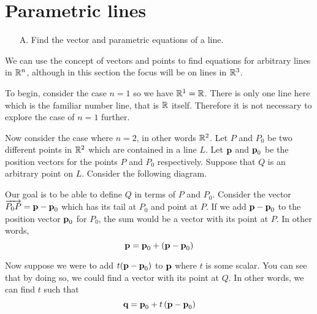 \section{Parametric lines}

\begin{outcome}

\begin{enumerate}

\item[A.] Find the vector and parametric equations of a line.

\end{enumerate}
\end{outcome}

We can use the concept of vectors and points to find equations for arbitrary lines in $\mathbb{R}^n$, although in this section the focus will be on lines in $\mathbb{R}^3$. 

To begin, consider the case $n=1$ so we have $\mathbb{R}^{1}=\mathbb{R}$. There is only one line here which is the familiar number line, that is $\mathbb{R}$ itself. Therefore it is not necessary to explore the case of $n=1$ further. 

Now consider the case where $n=2$, in other words $\mathbb{R}^2$.  Let $P $ and $P_0$ be
two different points in $\mathbb{R}^{2}$ which are contained in a line
$L$. Let $\mbox{\bf p}$ and $\mbox{\bf p}_0$ be the position vectors for the points $P$ and $P_0$
respectively. Suppose that $Q$ is an arbitrary point on $L$. Consider the following
diagram.

\begin{center}
\end{center}

Our goal is to be able to define $Q$ in terms of $P$  and $P_0$. Consider the vector $\overrightarrow{P_0P} = \mbox{\bf p} - \mbox{\bf p}_0$ which
has its tail at $P_0$ and point at $P$. If we add $\mbox{\bf p} - \mbox{\bf p}_0$ to the position vector $\mbox{\bf p}_0$ for $P_0$,  
the sum would be a vector with its point at $P$. 
In other words,
\begin{equation*}
\mbox{\bf p} = \mbox{\bf p}_0 + (\mbox{\bf p} - \mbox{\bf p}_0)
\end{equation*}

Now suppose we were to add $t(\mbox{\bf p} - \mbox{\bf p}_0)$ to $\mbox{\bf p}$ where $t$ is some scalar.
You can see that by doing so, we could find a vector with its point at $Q$. In other words, we can find $t$ such that 
\begin{equation*}
\mbox{\bf q} = \mbox{\bf p}_0 + t \left(\mbox{\bf p}- \mbox{\bf p}_0\right)
\end{equation*}

